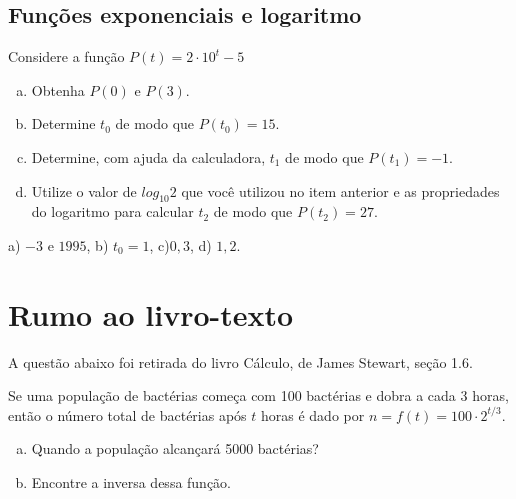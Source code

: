 \documentclass[main.tex]{subfiles}
\begin{document}
\subsection*{Funções exponenciais e logaritmo}

\begin{questao}
 Considere a função $P(t)=2 \cdot 10^t - 5$
\begin{enumerate}[a)]
\item Obtenha $P(0)$ e $P(3)$.
\item Determine $t_0$ de modo que $P(t_0)=15$.
\item Determine, com ajuda da calculadora, $t_1$ de modo que $P(t_1)=-1$.
\item Utilize o valor de $log_{10} 2$ que você utilizou no item anterior e as propriedades do logaritmo para calcular $t_2$ de modo que $P(t_2)=27$.
\end{enumerate}
\end{questao}

\begin{gabarito}
	\begin{gabaritoQuestao}
		a) $-3$ e $1995$, b) $t_0=1$, c)$0,3$, d) $1,2$.
	\end{gabaritoQuestao}
\end{gabarito}

\newpage

\section{Rumo ao livro-texto}

 A questão abaixo foi retirada do livro Cálculo, de James Stewart, seção 1.6.

\begin{resolvida}
 Se uma população de bactérias começa com 100 bactérias e dobra a cada 3 horas, então o número total de bactérias após $t$ horas é dado por $n= f(t) = 100 \cdot 2^{t/3}$.
\begin{enumerate}[a)]
 \item Quando a população alcançará 5000 bactérias?
 \item Encontre a inversa dessa função.
\end{enumerate}
\end{resolvida}
\end{document}
